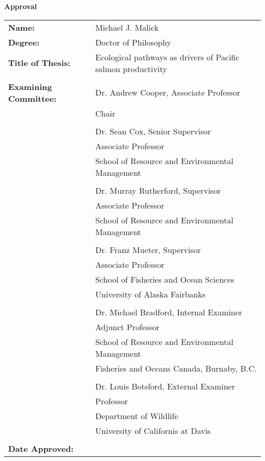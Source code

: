 


\begin{center}
{ \large \textbf{Approval} }
\end{center}

\vspace{4mm}

\hspace*{-1cm} \begin{tabular}{ l p{94mm} }
  \textbf{Name:} & Michael J. Malick \\
  \textbf{Degree:} & Doctor of Philosophy \\
  \textbf{Title of Thesis:} & Ecological pathways as drivers of Pacific salmon
  productivity \\

  & \\

  \textbf{Examining Committee:} & Dr. Andrew Cooper, Associate Professor \\
                                & Chair \\

    & \\ \cline{2-2}
    & Dr. Sean Cox, Senior Supervisor \\
    & Associate Professor \\
    & School of Resource and Environmental Management \\

    & \\ \cline{2-2}
    & Dr. Murray Rutherford, Supervisor \\
    & Associate Professor \\
    & School of Resource and Environmental Management \\

    & \\ \cline{2-2}
    & Dr. Franz Mueter, Supervisor \\
    & Associate Professor \\
    & School of Fisheries and Ocean Sciences\\
    & University of Alaska Fairbanks\\

    & \\ \cline{2-2}
    & Dr. Michael Bradford, Internal Examiner \\
    & Adjunct Professor \\
    & School of Resource and Environmental Management \\
    & Fisheries and Oceans Canada, Burnaby, B.C. \\

    & \\ \cline{2-2}
    & Dr. Louis Botsford, External Examiner \\
    & Professor \\
    & Department of Wildlife \\
    & University of Californis at Davis \\
    
    & \\
  \textbf{Date Approved:}  & \\  \cline{2-2}
\end{tabular}


